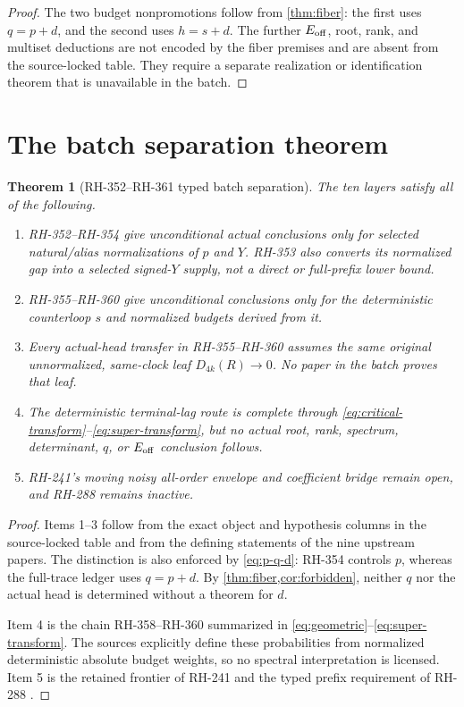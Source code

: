 \documentclass[11pt]{article}
\newtheorem{theorem}{Theorem}[section]
\theoremstyle{definition}
\theoremstyle{remark}
\begin{document}
\begin{proof}
The two budget nonpromotions follow from \cref{thm:fiber}: the first uses
$q=p+d$, and the second uses $h=s+d$.  The further $E_{\rm off}$, root,
rank, and multiset deductions are not encoded by the fiber premises and are
absent from the source-locked table.  They require a separate realization
or identification theorem that is unavailable in the batch.
\end{proof}

\section{The batch separation theorem}

\begin{theorem}[RH-352--RH-361 typed batch separation]
\label{thm:batch}
The ten layers satisfy all of the following.
\begin{enumerate}
\item RH-352--RH-354 give unconditional actual conclusions only for selected
natural/alias normalizations of $p$ and $Y$.  RH-353 also converts its
normalized gap into a selected signed-$Y$ supply, not a direct or full-prefix
lower bound.
\item RH-355--RH-360 give unconditional conclusions only for the
deterministic counterloop $s$ and normalized budgets derived from it.
\item Every actual-head transfer in RH-355--RH-360 assumes the same original
unnormalized, same-clock leaf $D_{4k}(R)\to0$.  No paper in the batch proves
that leaf.
\item The deterministic terminal-lag route is complete through
\eqref{eq:critical-transform}--\eqref{eq:super-transform}, but no actual
root, rank, spectrum, determinant, $q$, or $E_{\rm off}$ conclusion follows.
\item RH-241's moving noisy all-order envelope and coefficient bridge remain
open, and RH-288 remains inactive.
\end{enumerate}
\end{theorem}

\begin{proof}
Items 1--3 follow from the exact object and hypothesis columns in the
source-locked table and from the defining statements of the nine upstream
papers.  The distinction is also enforced by
\eqref{eq:p-q-d}: RH-354 controls $p$, whereas the full-trace ledger uses
$q=p+d$.  By \cref{thm:fiber,cor:forbidden}, neither $q$ nor the actual head
is determined without a theorem for $d$.

Item 4 is the chain RH-358--RH-360 summarized in
\eqref{eq:geometric}--\eqref{eq:super-transform}.  The sources explicitly
define these probabilities from normalized deterministic absolute budget
weights, so no spectral interpretation is licensed.  Item 5 is the retained
frontier of RH-241 and the typed prefix requirement of RH-288
\citep{WangTraceFrontier2026,WangGluing2026,WangSignedReview2026}.
\end{proof}
\end{document}
